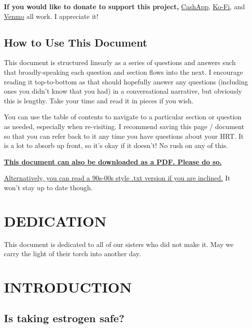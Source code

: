 \documentclass{article}
\begin{document}
\textbf{If you would like to donate to support this project,} \href{https://cash.app/Katitties}{CashApp}, \href{https://ko-fi.com/katitties}{Ko-Fi}, and \href{https://account.venmo.com/u/katitties}{Venmo} all work. I appreciate it!

\subsection*{How to Use This Document}

This document is structured linearly as a series of questions and answers such that broadly-speaking each question and section flows into the next. I encourage reading it top-to-bottom as that should hopefully answer any questions (including ones you didn’t know that you had) in a conversational narrative, but obviously this is lengthy. Take your time and read it in pieces if you wish.

You can use the table of contents to navigate to a particular section or question as needed, especially when re-visiting. I recommend saving this page / document so that you can refer back to it any time you have questions about your HRT. It is a lot to absorb up front, so it’s okay if it doesn’t! No rush on any of this.

\noindent\textbf{\href{pghrt.pdf}{This document can also be downloaded as a PDF. Please do so.}}

\noindent\href{pghrtgretchensversion.txt}{Alternatively, you can read a 90s-00s style .txt version if you are inclined.} It won't stay up to date though.



\section*{DEDICATION}

This document is dedicated to all of our sisters who did not make it. May we carry the light of their torch into another day.

 

\section{INTRODUCTION}

\subsection{Is taking estrogen safe?}
\end{document}
